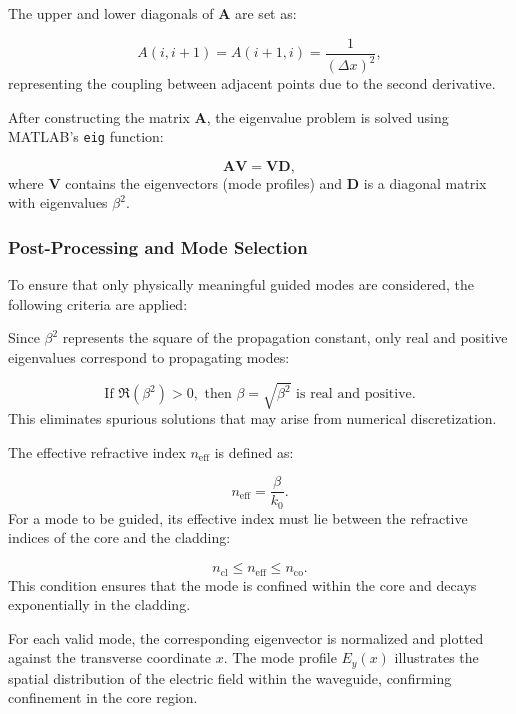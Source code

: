 \documentclass{article}
\begin{document}
The upper and lower diagonals of $\mathbf{A}$ are set as:

\begin{equation}
A(i, i+1) = A(i+1, i) = \frac{1}{(\Delta x)^2},
\end{equation}
representing the coupling between adjacent points due to the second derivative.

After constructing the matrix $\mathbf{A}$, the eigenvalue problem is solved using MATLAB's \texttt{eig} function:

\begin{equation}
\mathbf{A} \mathbf{V} = \mathbf{V} \mathbf{D},
\end{equation}
where $\mathbf{V}$ contains the eigenvectors (mode profiles) and $\mathbf{D}$ is a diagonal matrix with eigenvalues $\beta^2$.

\subsubsection{Post-Processing and Mode Selection}

To ensure that only physically meaningful guided modes are considered, the following criteria are applied:

Since $\beta^2$ represents the square of the propagation constant, only real and positive eigenvalues correspond to propagating modes:

\begin{equation}
\text{If } \Re(\beta^2) > 0, \text{ then } \beta = \sqrt{\beta^2} \text{ is real and positive.}
\end{equation}
This eliminates spurious solutions that may arise from numerical discretization.

The effective refractive index $n_{\text{eff}}$ is defined as:

\begin{equation}
n_{\text{eff}} = \frac{\beta}{k_0}.
\end{equation}
For a mode to be guided, its effective index must lie between the refractive indices of the core and the cladding:

\begin{equation}
n_{\text{cl}} \leq n_{\text{eff}} \leq n_{\text{co}}.
\end{equation}
This condition ensures that the mode is confined within the core and decays exponentially in the cladding.


For each valid mode, the corresponding eigenvector is normalized and plotted against the transverse coordinate $x$. The mode profile $E_y(x)$ illustrates the spatial distribution of the electric field within the waveguide, confirming confinement in the core region.
\end{document}
